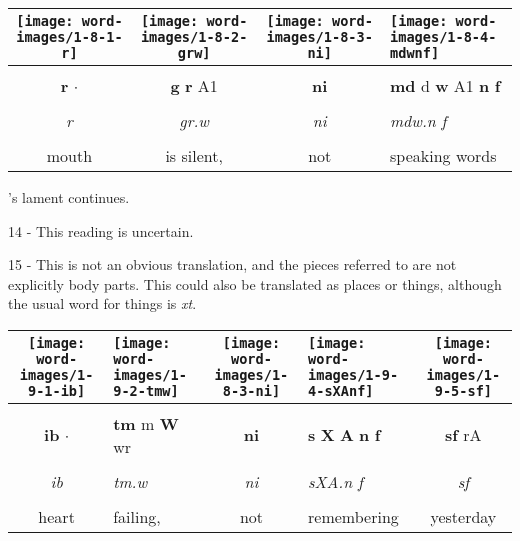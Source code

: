 \vspace{7.5mm}

\begin{tabularx}{\linewidth}{cccY}
	\texttt{[image: word-images/1-8-1-r]} &
	\texttt{[image: word-images/1-8-2-grw]} &
	\texttt{[image: word-images/1-8-3-ni]} &
	\texttt{[image: word-images/1-8-4-mdwnf]} \\
	\hline \\ 
	\textbf{r} $\cdot$ &
	\textbf{g} \textbf{r} A1 &
	\textbf{ni} &
	\textbf{md} d \textbf{w} A1 \textbf{n} \textbf{f} \\
	\hline \\ 
	\textit{r} & \textit{gr.w} & \textit{ni} & \textit{mdw.n f} \\
	\hline \\ 
	mouth & is silent, & not & speaking words
\end{tabularx}

\vspace*{\fill}

\pagebreak

\vspace*{\fill}

's lament continues.

\vspace*{\fill}

14 - This reading is uncertain.

15 - This is not an obvious translation, and the pieces referred to are not explicitly body parts. This could also be translated as places or things, although the usual word for things is \textit{xt}.

\vspace*{\fill}

\pagebreak

\vspace*{\fill}

\begin{tabularx}{\linewidth}{cYcYc}
	\texttt{[image: word-images/1-9-1-ib]} &
	\texttt{[image: word-images/1-9-2-tmw]} &
	\hspace{4mm}\texttt{[image: word-images/1-8-3-ni]} &
	\texttt{[image: word-images/1-9-4-sXAnf]} &
	\texttt{[image: word-images/1-9-5-sf]} \\
	\hline \\ 
	\textbf{ib} $\cdot$ &
	\textbf{tm} m \textbf{W} wr &
	\hspace{4mm}\textbf{ni} &
	\textbf{s} \textbf{X} \textbf{A} \textbf{n} \textbf{f} &
	\textbf{sf} rA \\
	\hline \\ 
	\textit{ib} & \textit{tm.w} & \hspace{4mm}\textit{ni} & \textit{sXA.n f} & \textit{sf} \\
	\hline \\ 
	heart & failing, & \hspace{3mm}not & remembering & yesterday
\end{tabularx}

